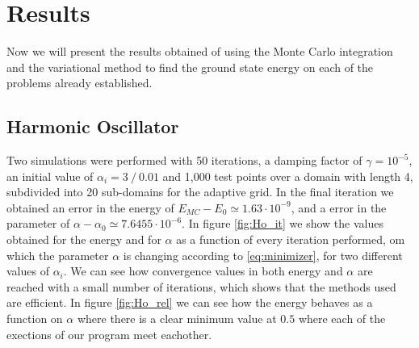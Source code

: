 
\section{Results}
Now we will present the results obtained of using the Monte Carlo integration and the variational
method to find the ground state energy on each of the problems already established.

\subsection{Harmonic Oscillator}
Two simulations were performed with 50 iterations, a damping factor of $\gamma = 10^{-5}$,
an initial value of $\alpha_i = 3~/~ 0.01$  and 1,000 test points over a domain with length 4,
subdivided into 20 sub-domains for the adaptive grid. In the final iteration we obtained an
error in the energy of $E_{MC}-E_0 \simeq 1.63\cdot 10^{-9}$,
and a error in the parameter of $\alpha - \alpha_0 \simeq 7.6455\cdot 10^{-6}$. In figure \ref{fig:Ho_it}
we show the values obtained for the energy and for $\alpha$ as a function of every iteration performed,
om which the parameter $\alpha$ is changing according to \ref{eq:minimizer},
for two different values of $\alpha_i$. We can see how  convergence values in both energy and $\alpha$ are
reached with a small number of iterations, which shows that the methods used are efficient. In figure
 \ref{fig:Ho_rel} we can see how the energy behaves as a function on $\alpha$ where there is a clear
minimum value at $0.5$ where each of the exections of our program meet eachother.
